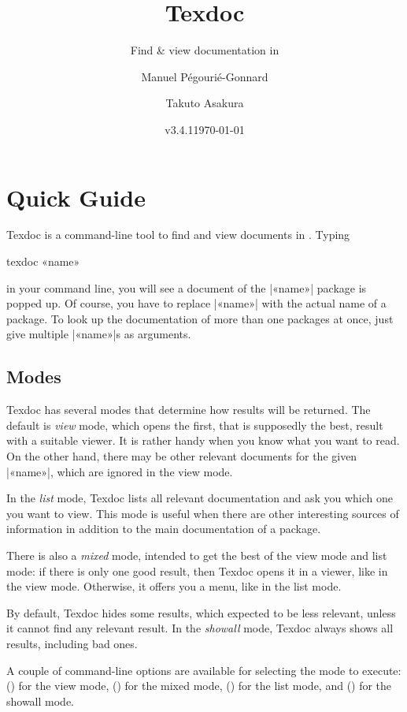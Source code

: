 \documentclass{texdoc-doc}
\title{Texdoc}
\subtitle{Find \& view documentation in \TL}
\author{Manuel Pégourié-Gonnard\and Takuto Asakura}
\date{v3.4.1\quad \today}
\begin{document}
\VerbatimFootnotes

\maketitle

\section{Quick Guide}

Texdoc is a command-line tool to find and view documents in {\TL}. Typing
%
\begin{htcode}
texdoc «name»
\end{htcode}
%
in your command line, you will see a document of the |«name»| package is popped
up. Of course, you have to replace |«name»| with the actual name of a package.
To look up the documentation of more than one packages at once, just give
multiple |«name»|s as arguments.

\subsection{Modes}
\label{sec:modes}

Texdoc has several modes that determine how results will be returned. The
default is \emph{view} mode, which opens the first, that is supposedly the
best, result with a suitable viewer. It is rather handy when you know what you
want to read. On the other hand, there may be other relevant documents for the
given |«name»|, which are ignored in the view mode.

In the \emph{list} mode, Texdoc lists all relevant documentation and ask you
which one you want to view. This mode is useful when there are other
interesting sources of information in addition to the main documentation of a
package.

There is also a \emph{mixed} mode, intended to get the best of the view mode
and list mode: if there is only one good result, then Texdoc opens it in a
viewer, like in the view mode. Otherwise, it offers you a menu, like in the
list mode.

By default, Texdoc hides some results, which expected to be less relevant,
unless it cannot find any relevant result. In the \emph{showall} mode, Texdoc
always shows all results, including bad ones.

A couple of command-line options are available for selecting the mode to
execute:  () for the view mode,  () for
the mixed mode,  () for the list mode, and 
() for the showall mode.
\end{document}
